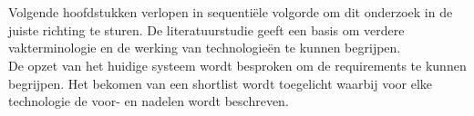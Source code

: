 
\chapter{}%
\label{ch:methodologie}


Volgende hoofdstukken verlopen in sequentiële volgorde om dit onderzoek in de juiste richting te sturen.
De literatuurstudie geeft een basis om verdere vakterminologie en de werking van technologieën te kunnen begrijpen.
\\
De opzet van het huidige systeem wordt besproken om de requirements te kunnen begrijpen.
Het bekomen van een shortlist wordt toegelicht waarbij voor elke technologie de voor- en nadelen wordt beschreven.

